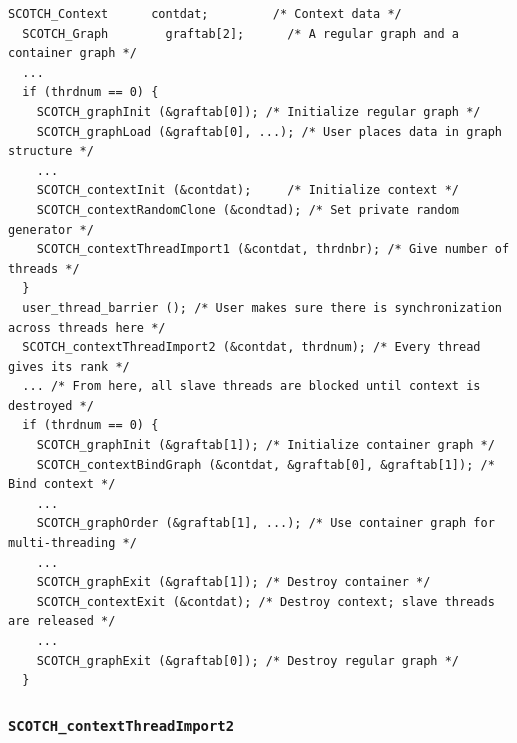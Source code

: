 \begin{lstlisting}[float,style=language-c,label={list-lib-context-import},caption={Sample
code for capturing a pool of threads and launching multi-threaded
computations using this pool. All \libscotch\ routines which are
passed the context graph (instead of the regular graph) will make use
of the captured threads.}]
  SCOTCH_Context      contdat;         /* Context data */
  SCOTCH_Graph        graftab[2];      /* A regular graph and a container graph */
  ...
  if (thrdnum == 0) {
    SCOTCH_graphInit (&graftab[0]); /* Initialize regular graph */
    SCOTCH_graphLoad (&graftab[0], ...); /* User places data in graph structure */
    ...
    SCOTCH_contextInit (&contdat);     /* Initialize context */
    SCOTCH_contextRandomClone (&condtad); /* Set private random generator */
    SCOTCH_contextThreadImport1 (&contdat, thrdnbr); /* Give number of threads */
  }
  user_thread_barrier (); /* User makes sure there is synchronization across threads here */
  SCOTCH_contextThreadImport2 (&contdat, thrdnum); /* Every thread gives its rank */
  ... /* From here, all slave threads are blocked until context is destroyed */
  if (thrdnum == 0) {
    SCOTCH_graphInit (&graftab[1]); /* Initialize container graph */
    SCOTCH_contextBindGraph (&contdat, &graftab[0], &graftab[1]); /* Bind context */
    ...
    SCOTCH_graphOrder (&graftab[1], ...); /* Use container graph for multi-threading */
    ...
    SCOTCH_graphExit (&graftab[1]); /* Destroy container */
    SCOTCH_contextExit (&contdat); /* Destroy context; slave threads are released */
    ...
    SCOTCH_graphExit (&graftab[0]); /* Destroy regular graph */
  }
\end{lstlisting}

\subsubsection{\texttt{SCOTCH\_contextThreadImport2}}

